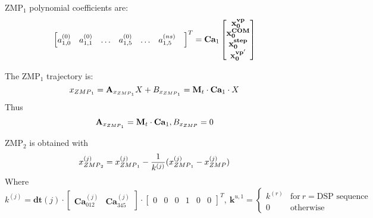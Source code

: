 \documentclass[journal]{IEEEtran}
\begin{document}
ZMP$_1$ polynomial coefficients are:
\begin{equation}
\begin{bmatrix}
a_{1,0}^{(0)} & a_{1,1}^{(0)} &
\ldots &
a_{1,5}^{(0)} &
\ldots &
a_{1,5}^{(ns)} &
\end{bmatrix}^{T}
=
\textbf{Ca}_1
\begin{bmatrix}
\mathbf{x^{vp}_0} \\
\mathbf{x^{\mbox{\tiny COM}}_0} \\
\mathbf{x^{\mbox{\tiny step}}_0} \\
\mathbf{x^{vp'}_0}
\end{bmatrix}
\end{equation}

The ZMP$_1$ trajectory is:
\begin{equation}
\label{eq:zmp1_def}
x_{\mbox{\tiny ZMP}_1}=\mathbf{A}_{x_{\mbox{\tiny ZMP}_1}} X + B_{x_{\mbox{\tiny ZMP}_1}}=\textbf{M}_t\cdot\textbf{Ca}_1\cdot X
\end{equation}
Thus
\begin{equation}
\begin{split}
\mathbf{A}_{x_{\mbox{\tiny ZMP}_1}}=
\textbf{M}_t\cdot\textbf{Ca}_1, B_{x_{\mbox{\tiny ZMP}}}=0
\end{split}
\end{equation}

ZMP$_2$ is obtained with
\begin{equation}
x_{\mbox{\tiny ZMP}_2}^{(j)}=x_{\mbox{\tiny ZMP}_1}^{(j)}-\dfrac{1}{k^{(j)}}(x_{\mbox{\tiny ZMP}_1}^{(j)}-x_{\mbox{\tiny ZMP}}^{(j)})
\end{equation}
Where
\begin{equation}
k^{(j)}=\mathbf{dt}(j)\cdot \begin{bmatrix}
\mathbf{Ca}^{(j)}_{012} & \textbf{Ca}^{(j)}_{345}
\end{bmatrix}
\cdot
\begin{bmatrix}
0 & 0 & 0 & 1 & 0 & 0
\end{bmatrix}^{T}, \ \mathbf{k}^{u,1}=
\left\lbrace 
\begin{matrix}
k^{(r)} & \mbox{for} \ r=\mbox{DSP sequence}\\
0 & \mbox{otherwise} 
\end{matrix}
\right.
\end{equation}
\end{document}
